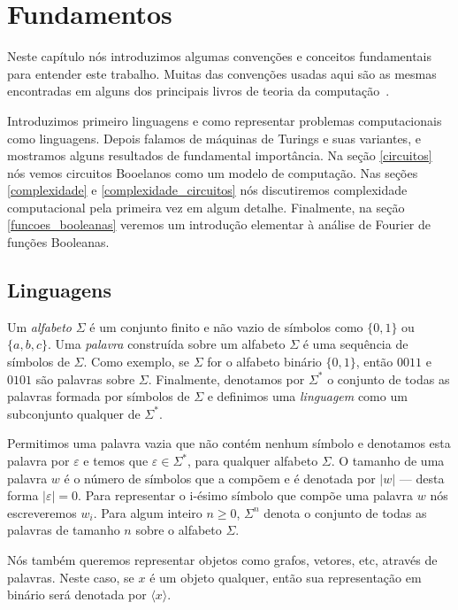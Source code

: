 \chapter{Fundamentos}

Neste capítulo nós introduzimos algumas convenções e conceitos fundamentais para entender este trabalho. Muitas das convenções usadas aqui são as mesmas encontradas em alguns dos principais livros de teoria da computação~\cite{arora2009computational, goldreich2000computational, savage1998models, lewis1997elements, sipser2012introduction}. 

Introduzimos primeiro linguagens e como representar problemas computacionais como linguagens. Depois falamos de máquinas de Turings e suas variantes, e mostramos alguns resultados de fundamental importância. Na seção \ref{circuitos} nós vemos circuitos Booelanos como um modelo de computação. Nas seções \ref{complexidade} e \ref{complexidade_circuitos} nós discutiremos complexidade computacional pela primeira vez em algum detalhe. Finalmente, na seção \ref{funcoes_booleanas} veremos um introdução elementar à análise de Fourier de funções Booleanas.


\section{Linguagens} \label{linguagens}

Um \emph{alfabeto} $\Sigma$ é um conjunto finito e não vazio de símbolos como $\{0, 1\}$ ou $\{a, b, c\}$. Uma \emph{palavra} construída sobre um alfabeto $\Sigma$ é uma sequência de símbolos de $\Sigma$. Como exemplo, se $\Sigma$ for o alfabeto binário $\{0, 1\}$, então $0011$ e $0101$ são palavras sobre $\Sigma$. Finalmente, denotamos por $\Sigma^{*}$ o conjunto de todas as palavras formada por símbolos de $\Sigma$ e definimos uma \emph{linguagem} como um subconjunto qualquer de $\Sigma^{*}$.

Permitimos uma palavra vazia que não contém nenhum símbolo e denotamos esta palavra por $\varepsilon$ e temos que $\varepsilon \in \Sigma^{*}$, para qualquer alfabeto $\Sigma$. O tamanho de uma palavra $w$ é o número de símbolos que a compõem e é denotada por $\lvert w \rvert$ --- desta forma $\lvert \varepsilon \rvert = 0$. Para representar o i-ésimo símbolo que compõe uma palavra $w$ nós escreveremos $w_{i}$. Para algum inteiro $n \geq 0$, $\Sigma^{n}$ denota o conjunto de todas as palavras de tamanho $n$ sobre o alfabeto $\Sigma$.

Nós também queremos representar objetos como grafos, vetores, etc, através de palavras. Neste caso, se $x$ é um objeto qualquer, então sua representação em binário será denotada por $\langle x \rangle$.

